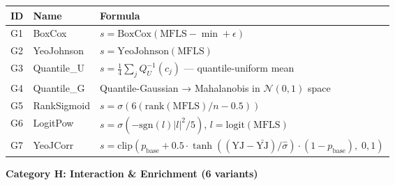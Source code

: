 \documentclass[
  11pt,
]{article}
\newcounter{none} %
\begin{document}
{\def\LTcaptype{none} %
\begin{longtable}[]{@{}
  >{\raggedright\arraybackslash}p{}
  >{\raggedright\arraybackslash}p{}
  >{\raggedright\arraybackslash}p{}@{}}
\toprule\noalign{}
\begin{minipage}[b]{\linewidth}\raggedright
ID
\end{minipage} & \begin{minipage}[b]{\linewidth}\raggedright
Name
\end{minipage} & \begin{minipage}[b]{\linewidth}\raggedright
Formula
\end{minipage} \\
\midrule\noalign{}
\endhead
\bottomrule\noalign{}
\endlastfoot
G1 & BoxCox & \(s = \text{BoxCox}(\text{MFLS} - \min + \epsilon)\) \\
G2 & YeoJohnson & \(s = \text{YeoJohnson}(\text{MFLS})\) \\
G3 & Quantile\_U & \(s = \frac{1}{4}\sum_j Q_U^{-1}(c_j)\) —
quantile-uniform mean \\
G4 & Quantile\_G & Quantile-Gaussian → Mahalanobis in
\(\mathcal{N}(0,1)\) space \\
G5 & RankSigmoid &
\(s = \sigma(6(\text{rank}(\text{MFLS})/n - 0.5))\) \\
G6 & LogitPow & \(s = \sigma(-\text{sgn}(l)|l|^2/5)\),
\(l = \text{logit}(\text{MFLS})\) \\
G7 & YeoJCorr &
\(s = \text{clip}(p_{\text{base}} + 0.5 \cdot \tanh((\text{YJ}-\bar{\text{YJ}})/\hat{\sigma}) \cdot (1-p_{\text{base}}),\; 0, 1)\) \\
\end{longtable}
}

\textbf{Category H: Interaction \& Enrichment (6 variants)}
\end{document}
